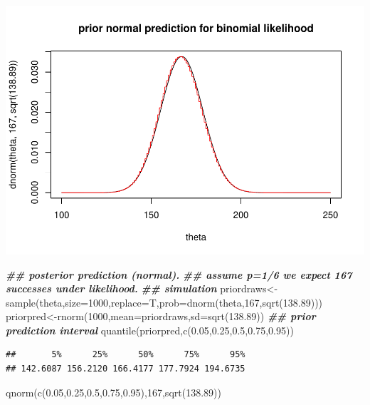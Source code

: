 \documentclass[
]{book}
\newenvironment{Shaded}{\begin{snugshade}}{\end{snugshade}}
\newcommand{\AttributeTok}[1]{\textcolor[rgb]{0.77,0.63,0.00}{#1}}
\newcommand{\DecValTok}[1]{\textcolor[rgb]{0.00,0.00,0.81}{#1}}
\newcommand{\DocumentationTok}[1]{\textcolor[rgb]{0.56,0.35,0.01}{\textbf{\textit{#1}}}}
\newcommand{\FloatTok}[1]{\textcolor[rgb]{0.00,0.00,0.81}{#1}}
\newcommand{\FunctionTok}[1]{\textcolor[rgb]{0.00,0.00,0.00}{#1}}
\newcommand{\NormalTok}[1]{#1}
\newcommand{\OtherTok}[1]{\textcolor[rgb]{0.56,0.35,0.01}{#1}}
\theoremstyle{definition}
\theoremstyle{definition}
\theoremstyle{definition}
\theoremstyle{definition}
\theoremstyle{remark}
\begin{document}
\includegraphics{_main_files/figure-latex/unnamed-chunk-13-1.pdf}

\begin{Shaded}
\begin{Highlighting}[]
  \DocumentationTok{\#\# posterior prediction (normal).}
     \DocumentationTok{\#\# assume p=1/6 we expect 167 successes under likelihood.}
\DocumentationTok{\#\# simulation     }
\NormalTok{     priordraws}\OtherTok{\textless{}{-}}\FunctionTok{sample}\NormalTok{(theta,}\AttributeTok{size=}\DecValTok{1000}\NormalTok{,}\AttributeTok{replace=}\NormalTok{T,}\AttributeTok{prob=}\FunctionTok{dnorm}\NormalTok{(theta,}\DecValTok{167}\NormalTok{,}\FunctionTok{sqrt}\NormalTok{(}\FloatTok{138.89}\NormalTok{)))}
\NormalTok{     priorpred}\OtherTok{\textless{}{-}}\FunctionTok{rnorm}\NormalTok{(}\DecValTok{1000}\NormalTok{,}\AttributeTok{mean=}\NormalTok{priordraws,}\AttributeTok{sd=}\FunctionTok{sqrt}\NormalTok{(}\FloatTok{138.89}\NormalTok{))}
     \DocumentationTok{\#\# prior prediction interval}
     \FunctionTok{quantile}\NormalTok{(priorpred,}\FunctionTok{c}\NormalTok{(}\FloatTok{0.05}\NormalTok{,}\FloatTok{0.25}\NormalTok{,}\FloatTok{0.5}\NormalTok{,}\FloatTok{0.75}\NormalTok{,}\FloatTok{0.95}\NormalTok{))}
\end{Highlighting}
\end{Shaded}

\begin{verbatim}
##       5%      25%      50%      75%      95% 
## 142.6087 156.2120 166.4177 177.7924 194.6735
\end{verbatim}

\begin{Shaded}
\begin{Highlighting}[]
     \FunctionTok{qnorm}\NormalTok{(}\FunctionTok{c}\NormalTok{(}\FloatTok{0.05}\NormalTok{,}\FloatTok{0.25}\NormalTok{,}\FloatTok{0.5}\NormalTok{,}\FloatTok{0.75}\NormalTok{,}\FloatTok{0.95}\NormalTok{),}\DecValTok{167}\NormalTok{,}\FunctionTok{sqrt}\NormalTok{(}\FloatTok{138.89}\NormalTok{))}
\end{Highlighting}
\end{Shaded}
\end{document}
